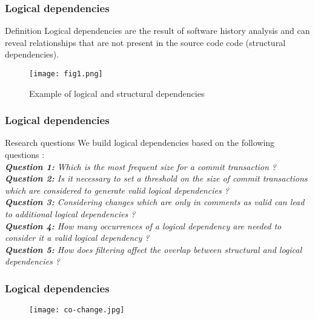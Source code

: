 \documentclass{beamer}
\begin{document}
 \begin{frame}
\frametitle{Logical dependencies}
\begin{block}{Definition}
 Logical dependencies are the result of software history analysis and can reveal relationships that are not present in the source code code (structural dependencies).
\end{block}

\begin{center}
     \begin{figure}
	\texttt{[image: fig1.png]}
	\caption{\label{fig:fig1}Example of logical and structural dependencies}
     \end{figure}
\end{center}

\end{frame}

\begin{frame}
\frametitle{Logical dependencies}
\begin{block}{Research questions}
 \vskip 0.3cm 
We build logical dependencies based on the following questions :\\
 \textit{\textbf{Question 1:} Which is the most frequent size for a commit transaction ?}\\
 \textit{\textbf{Question 2:} Is it necessary to set a threshold on the size of commit transactions which are considered to generate valid logical dependencies ?}\\
 \textit{\textbf{Question 3:} Considering changes which are only in comments as valid can lead to additional logical dependencies ?}\\
 \textit{\textbf{Question 4:} How many occurrences of a logical dependency are needed to consider it a valid logical dependency ? }\\ 
 \textit{\textbf{Question 5:} How does filtering affect the overlap between structural and logical dependencies ?}
\end{block} 
\end{frame}


 \begin{frame}
\frametitle{Logical dependencies}
\begin{center}
     \begin{figure}
	\texttt{[image: co-change.jpg]}
     \end{figure}
\end{center}

\end{frame}
\end{document}

